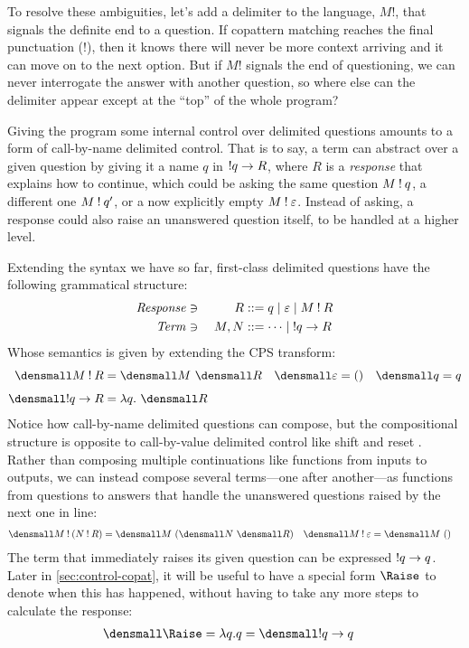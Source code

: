 \documentclass[sigplan,screen]{acmart}
\begin{document}
To resolve these ambiguities, let's add a delimiter to the language, $M!$, that
signals the definite end to a question.  If copattern matching reaches the final
punctuation ($!$), then it knows there will never be more context arriving and
it can move on to the next option.  But if $M!$ signals the end of questioning,
we can never interrogate the answer with another question, so where else can the
delimiter appear except at the ``top'' of the whole program?

Giving the program some internal control over delimited questions amounts to a
form of call-by-name delimited control.  That is to say, a term can abstract
over a given question by giving it a name $q$ in $\mathbin{!} q \to R$, where $R$ is a
\emph{response} that explains how to continue, which could be asking the same
question $M \mathbin{!} q$, a different one $M \mathbin{!} q'$, or a now explicitly empty
$M \mathbin{!} \varepsilon$.  Instead of asking, a response could also raise an
unanswered question itself, to be handled at a higher level.

Extending the syntax we have so far, first-class delimited questions have the
following grammatical structure:
\begin{alignat*}{2}
  \mathit{Response} &\ni{}& R
  &::= q
  \mid \varepsilon
  \mid M \mathbin{!} R
  \\
  \mathit{Term} &\ni{}& M, N
  &::= \dots
  \mid \mathbin{!} q \to R
\end{alignat*}
Whose semantics is given by extending the CPS transform:
\begin{align*}
  \den{M \ans R}
  &=
  \den{M} ~ \den{R}
  &
  \den{\varepsilon}
  &=
  ()
  &
  \den{q}
  &=
  q
  \\[1ex]
  \den{\ans q \to R}
  &=
  \lambda q.~ \den{R}
\end{align*}
Notice how call-by-name delimited questions can compose, but the compositional
structure is opposite to call-by-value delimited control like shift and reset
\cite{AbstractingControl,FunctionalAbstractionTypedContexts}.  Rather than
composing multiple continuations like functions from inputs to outputs, we can
instead compose several terms---one after another---as functions from questions
to answers that handle the unanswered questions raised by the next one in line:
\begin{align*}
  \den{M \ans (N \ans R)}
  &=
  \den{M} ~ (\den{N} ~ \den{R})
  &
  \den{M \ans \varepsilon}
  &=
  \den{M} ~ ()
\end{align*}
The term that immediately raises its given question can be expressed
$\mathbin{!} q \to q$.  Later in \cref{sec:control-copat}, it will be useful to have a
special form $\Raise$ to denote when this has happened, without having to take
any more steps to calculate the response:
\begin{align*}
  \den{\Raise}
  &=
  \lambda q. q
  = \den{\ans q \to q}
\end{align*}
\end{document}
